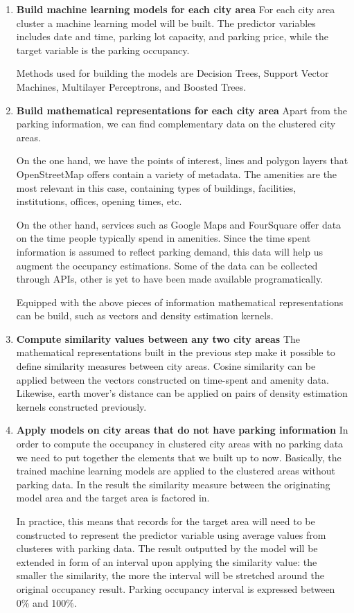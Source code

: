 \documentclass{ws-ijait}
\begin{document}
\begin{enumerate}[label=\Roman*]
		\item{\textbf{Build machine learning models for each city area}}
		For each city area cluster a machine learning model will be built. The predictor variables includes date and time, parking lot capacity, and parking price, while the target variable is the parking occupancy. 
		
		Methods used for building the models are Decision Trees, Support Vector Machines, Multilayer Perceptrons, and Boosted Trees.
		
		\item{\textbf{Build mathematical representations for each city area}}
		Apart from the parking information, we can find complementary data on the clustered city areas. 
		
		On the one hand, we have the points of interest, lines and polygon layers that OpenStreetMap offers contain a variety of metadata. The amenities are the most relevant in this case, containing types of buildings, facilities, institutions, offices, opening times, etc. 
		
		On the other hand, services such as Google Maps and FourSquare offer data on the time people typically spend in amenities. Since the time spent information is assumed to reflect parking demand, this data will help us augment the occupancy estimations. Some of the data can be collected through APIs, other is yet to have been made available programatically.  
		
		Equipped with the above pieces of information mathematical representations can be build, such as vectors and density estimation kernels.  		
		
		\item{\textbf{Compute similarity values between any two city areas}}
		The mathematical representations built in the previous step make it possible to define similarity measures between city areas. Cosine similarity can be applied between the vectors constructed on time-spent and amenity data. Likewise, earth mover's distance can be applied on pairs of density estimation kernels constructed previously.
		
		\item{\textbf{Apply models on city areas that do not have parking information}}
		In order to compute the occupancy in clustered city areas with no parking data we need to put together the elements that we built up to now. Basically, the trained machine learning models are applied to the clustered areas without parking data. In the result the similarity measure between the originating model area and the target area is factored in.
		
		In practice, this means that records for the target area will need to be constructed to represent the predictor variable using average values from clusteres with parking data. The result outputted by the model will be extended in form of an interval upon applying the similarity value: the smaller the similarity, the more the interval will be stretched around the original occupancy result. Parking occupancy interval is expressed between 0\% and 100\%.
		
	\end{enumerate}
	
\end{document}
